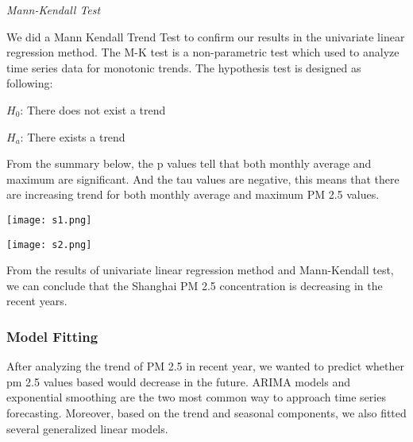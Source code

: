 \documentclass[11pt,]{article}
\begin{document}
\vspace{3mm}

\vspace{3mm}

\noindent\emph{Mann-Kendall Test }

\vspace{3mm}

We did a Mann Kendall Trend Test to confirm our results in the univariate linear regression method. The M-K test is a non-parametric test which used to analyze time series data for monotonic trends. The hypothesis test is designed as following:

$H_0$: There does not exist a trend

$H_a$: There exists a trend

From the summary below, the p values tell that both monthly average and maximum are significant. And the tau values are negative, this means that there are increasing trend for both monthly average and maximum PM 2.5 values.  

\vspace{3mm}

\begin{minipage}{.45\linewidth}
\begin{flushleft}

{\texttt{[image: s1.png]}}

\end{flushleft} 
\end{minipage}
\hfill
\begin{minipage}{.45\linewidth}
\begin{flushright} 

{\texttt{[image: s2.png]}}


\end{flushright} 
\end{minipage}

\vspace{3mm}

From the results of univariate linear regression method and Mann-Kendall test, we can conclude that the Shanghai PM 2.5 concentration is decreasing in the recent years.

\subsubsection{Model Fitting}

After analyzing the trend of PM 2.5 in recent year, we wanted to predict whether pm 2.5 values based would decrease in the future. ARIMA models and exponential smoothing are the two most common way to approach time series forecasting. Moreover, based on the trend and seasonal components, we also fitted several generalized linear models. 
\end{document}
